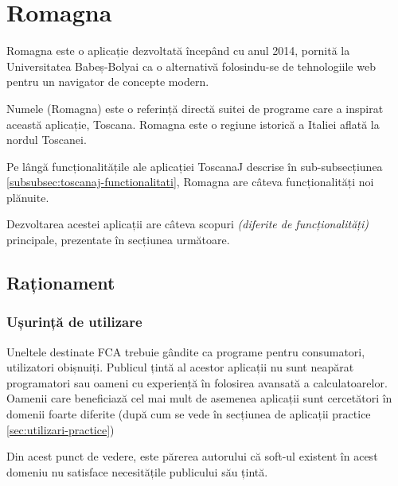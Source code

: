 \documentclass[12pt, a4paper, twoside, romanian]{teza-upb}
\begin{document}
\chapter{Romagna}
\label{chapter:3}

  Romagna este o aplicație dezvoltată începând cu anul 2014, pornită la Universitatea Babeș-Bolyai ca o alternativă folosindu-se de tehnologiile web pentru un navigator de concepte modern.

  Numele (Romagna) este o referință directă suitei de programe care a inspirat această aplicație, Toscana. Romagna este o regiune istorică a Italiei aflată la nordul Toscanei. 

  Pe lângă funcționalitățile ale aplicației ToscanaJ descrise în sub-subsecțiunea \ref{subsubsec:toscanaj-functionalitati}, Romagna are câteva funcționalități noi plănuite.

  Dezvoltarea acestei aplicații are câteva scopuri \textit{(diferite de funcționalități)} principale, prezentate în secțiunea următoare.

  \section{Raționament}
  \label{sec:rationament}

    \subsection{Ușurință de utilizare}
    \label{subsec:usurinta-de-utilizare}
      Uneltele destinate FCA trebuie gândite ca programe pentru consumatori, utilizatori obișnuiți. Publicul țintă al acestor aplicații nu sunt neapărat programatori sau oameni cu experiență în folosirea avansată a calculatoarelor. Oamenii care beneficiază cel mai mult de asemenea aplicații sunt cercetători în domenii foarte diferite (după cum se vede în secțiunea de aplicații practice \ref{sec:utilizari-practice})

      Din acest punct de vedere, este părerea autorului că soft-ul existent în acest domeniu nu satisface necesitățile publicului său țintă. 
\end{document}
